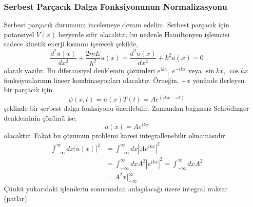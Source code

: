 \documentclass[a4paper,12pt, twoside]{article}
\begin{document}
\subsubsection{Serbest Parçacık Dalga Fonksiyonunun Normalizasyonu}

Serbest parçacık durumunu incelemeye devam edelim. Serbest parçacık için potansiyel $V(x)$ heryerde sıfır olacaktır, bu nedenle Hamiltonyen işlemcisi sadece kinetik enerji kısmını içerecek şekilde,
\begin{equation}
\frac { d ^ { 2 } u ( x ) } { d x ^ { 2 } } + \frac { 2 m E } { \hbar ^ { 2 } } u ( x ) = \frac { d ^ { 2 } u ( x ) } { d x ^ { 2 } } + k ^ { 2 } u ( x ) = 0
\label{eq:freeParticle_schEq}
\end{equation}
olarak yazılır. Bu diferansiyel denklemin çözümleri $e ^ { i k x }$, $e ^ { - i k x }$ veya $\sin kx$, $\cos kx$ fonksiyonlarının lineer kombinasyonları olacaktır. Örneğin, $+x$ yönünde ilerleyen bir parçacık için
\begin{equation}
\psi(x,t) = u(x) T(t) = A e ^ { (i k x -\omega t)}
\end{equation}
şeklinde bir serbest dalga fonksiyonu önerilebilir. Zamandan bağımsız Schrödinger denkleminin çözümü ise,
\begin{equation}
u(x) = A e ^ { i k x }
\end{equation}
olacaktır. Fakat bu çözümün problemi karesi integrallenebilir olmamasıdır.
\begin{align}
\int _ { - \infty } ^ { \infty } d x \left|u(x) \right| ^ { 2 } 
&= \int _ { - \infty } ^ { \infty } d x \left|A e ^ { i k x } \right|^2 \nonumber\\
&= \int _ { - \infty } ^ { \infty } d x A^2 \left|e ^ { i k x } \right|^2
= \int _ { - \infty } ^ { \infty } d x A^2 \nonumber\\
&= A^2 x\bigg|_{-\infty}^\infty
\end{align}
Çünkü yukarıdaki işlemlerin sonucundan anlaşılacağı üzere integral ıraksar (patlar). 
\end{document}
